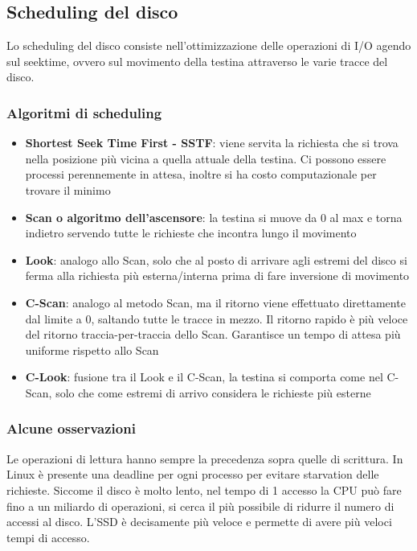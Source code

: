 \documentclass[a4paper]{article}
\begin{document}
\newpage


\subsection{Scheduling del disco}
Lo scheduling del disco consiste nell'ottimizzazione delle operazioni di I/O agendo sul seektime, ovvero sul movimento della
testina attraverso le varie tracce del disco.

\subsubsection*{Algoritmi di scheduling}
\begin{itemize}
	\item \textbf{Shortest Seek Time First - SSTF}: viene servita la richiesta che si trova nella posizione più vicina a quella
	attuale della testina. Ci possono essere processi perennemente in attesa, inoltre si ha costo computazionale per trovare
	il minimo
	\item \textbf{Scan o algoritmo dell'ascensore}: la testina si muove da 0 al max  e torna indietro servendo tutte le
	richieste che incontra lungo il movimento
	\item \textbf{Look}: analogo allo Scan, solo che al posto di arrivare agli estremi del disco si ferma alla richiesta
	più esterna/interna prima di fare inversione di movimento
	\item \textbf{C-Scan}: analogo al metodo Scan, ma il ritorno viene effettuato direttamente dal limite a 0, saltando tutte
	le tracce in mezzo. Il ritorno rapido è più veloce del ritorno traccia-per-traccia dello Scan. Garantisce un tempo di attesa
	più uniforme rispetto allo Scan
	\item \textbf{C-Look}: fusione tra il Look e il C-Scan, la testina si comporta come nel C-Scan, solo che come estremi di
	arrivo considera le richieste più esterne
\end{itemize}

\subsubsection*{Alcune osservazioni}
Le operazioni di lettura hanno sempre la precedenza sopra quelle di scrittura. In Linux è presente una deadline per ogni
processo per evitare starvation delle richieste. Siccome il disco è molto lento, nel tempo di 1 accesso la CPU può fare fino
a un miliardo di operazioni, si cerca il più possibile di ridurre il numero di accessi al disco. L'SSD è decisamente più veloce
e permette di avere più veloci tempi di accesso.
\end{document}
